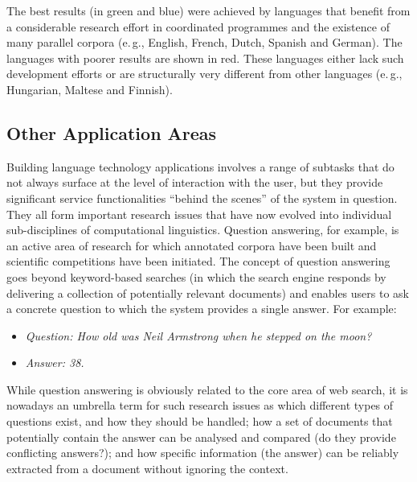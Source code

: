 \begin{multicols}{2}
The best results (in green and blue) were achieved by languages that benefit from a considerable research effort in coordinated programmes and the existence of many parallel corpora (e.\,g., English, French, Dutch, Spanish and German). The languages with poorer results are shown in red. These languages either lack such development efforts or are structurally very different from other languages (e.\,g., Hungarian, Maltese and Finnish).


\subsection{Other Application Areas}

Building language technology applications involves a range of subtasks that do not always surface at the level of interaction with the user, but they provide significant service functionalities “behind the scenes” of the system in question. They all form important research issues that have now evolved into individual sub-disciplines of computational linguistics.  Question answering, for example, is an active area of research for which annotated corpora have been built and scientific competitions have been initiated. The concept of question answering goes beyond keyword-based searches (in which the search engine responds by delivering a collection of potentially relevant documents) and enables users to ask a concrete question to which the system provides a single answer. For example:

\begin{itemize}
\item[] \textit{Question: How old was Neil Armstrong when he stepped on the moon?}
\item[] \textit{Answer: 38.}
\end{itemize}

While question answering is obviously related to the core area of web search, it is nowadays an umbrella term for such research issues as which different types of questions exist, and how they should be handled; how a set of documents that potentially contain the answer can be analysed and compared (do they provide conflicting answers?); and how specific information (the answer) can be reliably extracted from a document without ignoring the context. 



\end{multicols}
